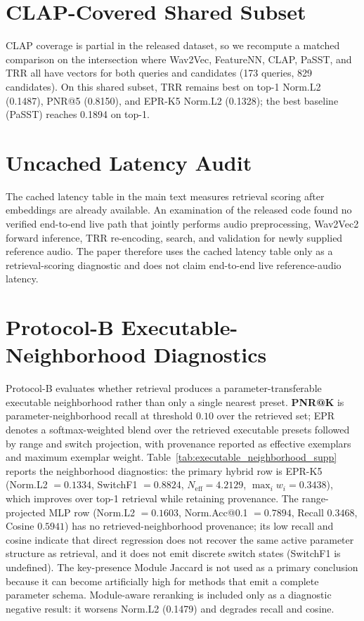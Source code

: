 \documentclass[journal,10pt]{IEEEtran}
\begin{document}
\section{CLAP-Covered Shared Subset}

CLAP coverage is partial in the released dataset, so we recompute a matched comparison on the intersection where Wav2Vec, FeatureNN, CLAP, PaSST, and TRR all have vectors for both queries and candidates (173 queries, 829 candidates). On this shared subset, TRR remains best on top-1 Norm.L2 (0.1487), PNR@5 (0.8150), and EPR-K5 Norm.L2 (0.1328); the best baseline (PaSST) reaches 0.1894 on top-1.

\section{Uncached Latency Audit}

The cached latency table in the main text measures retrieval scoring after embeddings are already available. An examination of the released code found no verified end-to-end live path that jointly performs audio preprocessing, Wav2Vec2 forward inference, TRR re-encoding, search, and validation for newly supplied reference audio. The paper therefore uses the cached latency table only as a retrieval-scoring diagnostic and does not claim end-to-end live reference-audio latency.

\section{Protocol-B Executable-Neighborhood Diagnostics}

Protocol-B evaluates whether retrieval produces a parameter-transferable executable neighborhood rather than only a single nearest preset. \textbf{PNR@K} is parameter-neighborhood recall at threshold $0.10$ over the retrieved set; EPR denotes a softmax-weighted blend over the retrieved executable presets followed by range and switch projection, with provenance reported as effective exemplars and maximum exemplar weight. Table~\ref{tab:executable_neighborhood_supp} reports the neighborhood diagnostics: the primary hybrid row is EPR-K5 (Norm.L2 $=0.1334$, SwitchF1 $=0.8824$, $N_{\mathrm{eff}}=4.2129$, $\max_i w_i=0.3438$), which improves over top-1 retrieval while retaining provenance. The range-projected MLP row (Norm.L2 $=0.1603$, Norm.Acc@0.1 $=0.7894$, Recall $0.3468$, Cosine $0.5941$) has no retrieved-neighborhood provenance; its low recall and cosine indicate that direct regression does not recover the same active parameter structure as retrieval, and it does not emit discrete switch states (SwitchF1 is undefined). The key-presence Module Jaccard is not used as a primary conclusion because it can become artificially high for methods that emit a complete parameter schema. Module-aware reranking is included only as a diagnostic negative result: it worsens Norm.L2 (0.1479) and degrades recall and cosine.
\end{document}
